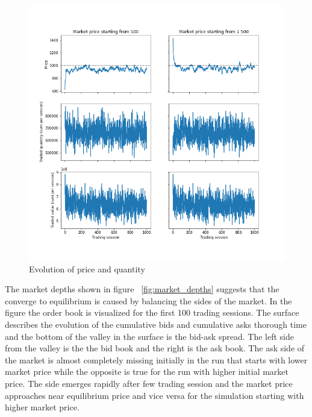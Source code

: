 \begin{figure}
    \includegraphics[width=\linewidth]{plots/basic_trades.png}
    \caption{Evolution of price and quantity}
    \label{fig:basic_trades}
\end{figure}

The market depths shown in figure ~\ref{fig:market_depths} suggests that the
converge to equilibrium is caused by balancing the sides of the market. 
In the figure the order book is visualized for the first 100 trading sessions. 
The surface describes the evolution of the cumulative bids and cumulative asks 
thorough time and the bottom of the valley in the surface is the bid-ask spread. 
The left side from the valley is the the bid book and the right is the ask book. The 
ask side of the market is almost completely missing initially in the run that
starts with lower market price while the opposite is true for the run with higher
initial market price. The side emerges rapidly after few trading session
and the market price approaches near equilibrium price and vice versa for the 
simulation starting with higher market price.

